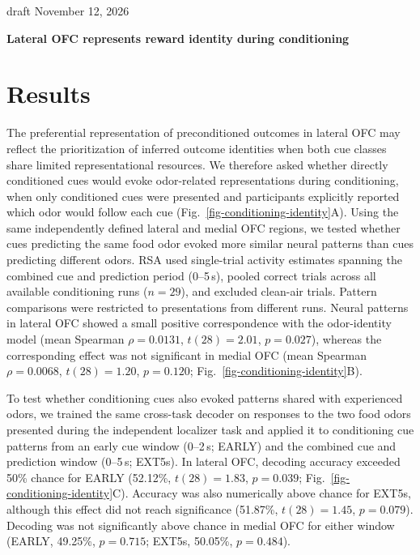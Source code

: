 \documentclass[11pt,letterpaper]{article}
\begin{document}
{\small\sffamily draft \hfill November 12, 2026\par}
\vspace{0.4\baselineskip}
{\Large\bfseries Lateral OFC represents reward identity during conditioning\par}
\vspace{0.4\baselineskip}

\section*{Results}

The preferential representation of preconditioned outcomes in lateral OFC may reflect the prioritization of inferred outcome identities when both cue classes share limited representational resources. We therefore asked whether directly conditioned cues would evoke odor-related representations during conditioning, when only conditioned cues were presented and participants explicitly reported which odor would follow each cue (Fig.~\ref{fig-conditioning-identity}A). Using the same independently defined lateral and medial OFC regions, we tested whether cues predicting the same food odor evoked more similar neural patterns than cues predicting different odors. RSA used single-trial activity estimates spanning the combined cue and prediction period (0--5\,s), pooled correct trials across all available conditioning runs ($n = 29$), and excluded clean-air trials. Pattern comparisons were restricted to presentations from different runs. Neural patterns in lateral OFC showed a small positive correspondence with the odor-identity model (mean Spearman $\rho = 0.0131$, $t(28) = 2.01$, $p = 0.027$), whereas the corresponding effect was not significant in medial OFC (mean Spearman $\rho = 0.0068$, $t(28) = 1.20$, $p = 0.120$; Fig.~\ref{fig-conditioning-identity}B).

To test whether conditioning cues also evoked patterns shared with experienced odors, we trained the same cross-task decoder on responses to the two food odors presented during the independent localizer task and applied it to conditioning cue patterns from an early cue window (0--2\,s; EARLY) and the combined cue and prediction window (0--5\,s; EXT5s). In lateral OFC, decoding accuracy exceeded 50\% chance for EARLY (52.12\%, $t(28) = 1.83$, $p = 0.039$; Fig.~\ref{fig-conditioning-identity}C). Accuracy was also numerically above chance for EXT5s, although this effect did not reach significance (51.87\%, $t(28) = 1.45$, $p = 0.079$). Decoding was not significantly above chance in medial OFC for either window (EARLY, 49.25\%, $p = 0.715$; EXT5s, 50.05\%, $p = 0.484$).
\end{document}
